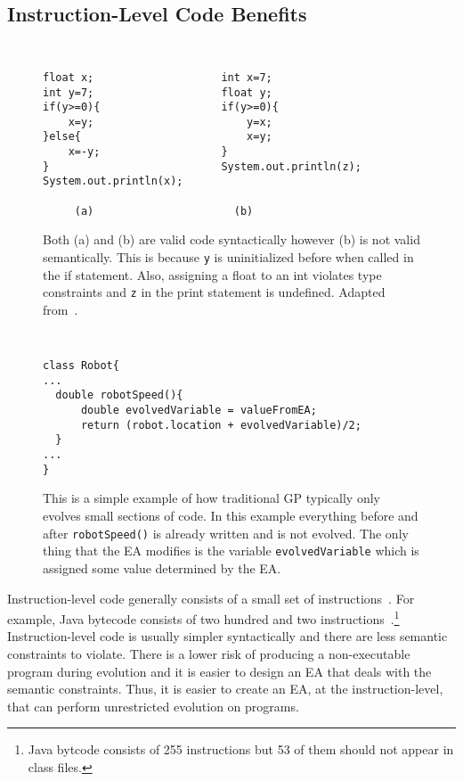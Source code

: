 \documentclass{sig-alternate}
\begin{document}
\subsection{Instruction-Level Code Benefits}
\begin{figure}
\centering
{\tt
\begin{verbatim}
float x;                    int x=7;
int y=7;                    float y;
if(y>=0){                   if(y>=0){
    x=y;                        y=x;
}else{                          x=y;
    x=-y;                   }
}                           System.out.println(z);
System.out.println(x);	
     
     (a)                      (b)

\end{verbatim}
}
\caption{Both (a) and (b) are valid code syntactically however (b) is not valid semantically. This is because \texttt{y} is uninitialized before when called in the if statement. Also, assigning a float to an int violates type constraints and \texttt{z} in the print statement is undefined. Adapted from~\cite{FINCH:2011}.}
\label{semantics}
\end{figure}

\begin{figure}
\centering
{\tt
\begin{verbatim}
class Robot{	
...
  double robotSpeed(){	
      double evolvedVariable = valueFromEA;
      return (robot.location + evolvedVariable)/2;
  }
...
}

\end{verbatim}
}
\caption{This is a simple example of how traditional GP typically only evolves small sections of code. In this example everything before and after \texttt{robotSpeed()} is already written and is not evolved. The only thing that the EA modifies is the variable \texttt{evolvedVariable} which is assigned some value determined by the EA.}
\label{traditional}
\end{figure}


Instruction-level code generally consists of a small set of instructions~\cite{Assembly:2010}. For example, Java bytecode consists of two hundred and two instructions~\cite{JVMspec:2013}.\footnote{Java bytcode consists of 255 instructions but 53 of them should not appear in class files.} Instruction-level code is usually simpler syntactically and there are less semantic constraints to violate. There is a lower risk of producing a non-executable program during evolution and it is easier to design an EA that deals with the semantic constraints. Thus, it is easier to create an EA, at the instruction-level, that can perform unrestricted evolution on programs.\par
\end{document}
